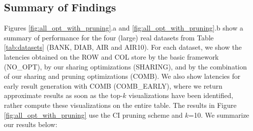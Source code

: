 

\subsection{Summary of Findings}
\label{sec:expt_summary}


Figures \ref{fig:all_opt_with_pruning}.a and \ref{fig:all_opt_with_pruning}.b show a summary of \SeeDB performance for the four 
(large) real datasets from Table \ref{tab:datasets} (BANK, DIAB, AIR and AIR10).
For each dataset, we show the latencies obtained on the ROW and COL store by the basic \SeeDB framework (NO\_OPT), 
by our sharing optimizations (SHARING), and by the combination of our sharing and pruning optimizations (COMB). 
We also show latencies for early result generation with COMB (COMB\_EARLY), where we return approximate results 
as soon as the top-$k$ visualizations have been identified, rather compute these visualizations on the entire table.
The results in Figure \ref{fig:all_opt_with_pruning} 
use the CI pruning scheme and $k$=10. We summarize our results below:



